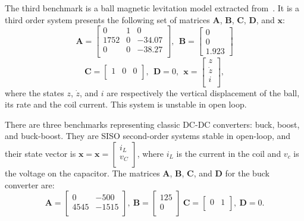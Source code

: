 \documentclass[runningheads,a4paper]{llncs}
\begin{document}
The third benchmark is a ball magnetic levitation model extracted from~\cite{maglev}. It is a third order system presents the following set of matrices $\textbf{A}$, $\textbf{B}$, $\textbf{C}$, $\textbf{D}$, and $\textbf{x}$:
$$
\textbf{A}=\left[\begin{array}{ccc}
0		& 1 		& 0		\\
1752	& 0			& -34.07\\
0		& 0			& -38.27\\
\end{array}\right],~~ \textbf{B} = \left[\begin{array}{c}
0 \\ 0 \\ 1.923
\end{array}\right]
$$
%
$$
\textbf{C}=\left[\begin{array}{ccc}
1 & 0 & 0\\
\end{array}\right],~~ \textbf{D}= 0,~~ \textbf{x}=\left[\begin{array}{c}
z \\ \dot{z} \\ i \\
\end{array}\right],
$$
where the states $z$, $\dot{z}$, and $i$ are respectively the vertical displacement of the ball, its rate and the coil current. This system  is unstable in open loop.

There are three benchmarks representing classic DC-DC converters: buck, boost, and buck-boost. They are SISO second-order systems stable in open-loop, and their state vector is $\textbf{x}=\textbf{x}=\left[\begin{array}{c}
i_{L} \\ v_{C}\\
\end{array}\right]$, where $i_{L}$ is the current in the coil and $v_{c}$ is the voltage on the capacitor. The matrices $\textbf{A}$, $\textbf{B}$, $\textbf{C}$, and $\textbf{D}$ for the buck converter are:
$$
\textbf{A}=\left[\begin{array}{cc}
0		& -500 \\
4545	& -1515\\
\end{array}\right],~ \textbf{B} = \left[\begin{array}{c}
125 \\ 0 \\
\end{array}\right]~
\textbf{C}=\left[\begin{array}{cc}
0 & 1\\
\end{array}\right],~ \textbf{D}= 0.
$$
\end{document}
